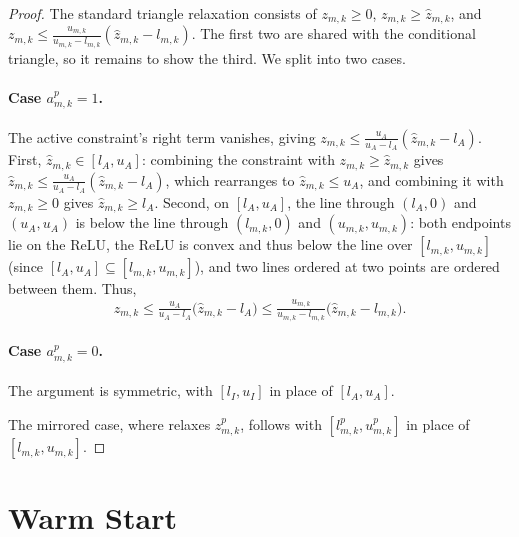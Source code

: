 {{\begin{proof}
The standard triangle relaxation consists of $z_{m,k}\geq 0$,
$z_{m,k}\geq \hat z_{m,k}$, and
$z_{m,k}\leq \tfrac{u_{m,k}}{u_{m,k}-l_{m,k}}(\hat z_{m,k}-l_{m,k})$. The first two
are shared with the conditional triangle, so it remains to show the third. We split into
two cases.

\paragraph{Case $a^{p}_{m,k}=1$.}
The active constraint's right term vanishes, giving
$z_{m,k}\leq \tfrac{u_A}{u_A-l_A}(\hat z_{m,k}-l_A)$.
First,
$\hat z_{m,k}\in[l_A,u_A]$: combining the constraint with $z_{m,k}\geq \hat z_{m,k}$
gives $\hat z_{m,k}\leq \tfrac{u_A}{u_A-l_A}(\hat z_{m,k}-l_A)$, which rearranges to
$\hat z_{m,k}\leq u_A$, and combining it with $z_{m,k}\geq 0$ gives
$\hat z_{m,k}\geq l_A$. Second, on $[l_A,u_A]$, the line through $(l_A,0)$ and
$(u_A,u_A)$ is below the line through $(l_{m,k},0)$ and $(u_{m,k},u_{m,k})$: both
endpoints lie on the ReLU, the ReLU is convex and thus below the line over
$[l_{m,k},u_{m,k}]$ (since $[l_A,u_A]\subseteq[l_{m,k},u_{m,k}]$), and two lines
ordered at two points are ordered between them. Thus,
\[
 z_{m,k}\leq \tfrac{u_A}{u_A-l_A}\bigl(\hat z_{m,k}-l_A\bigr)
 \leq \tfrac{u_{m,k}}{u_{m,k}-l_{m,k}}\bigl(\hat z_{m,k}-l_{m,k}\bigr).
\]


\paragraph{Case $a^{p}_{m,k}=0$.}
The argument is symmetric, with $[l_I,u_I]$ in place of $[l_A,u_A]$.

The mirrored case, where \tool relaxes $z^{p}_{m,k}$, follows with
$[l^{p}_{m,k},u^{p}_{m,k}]$ in place of $[l_{m,k},u_{m,k}]$.
\end{proof}
\par}

\section{Warm Start}
\label{sec:blend-warm-start}

}
